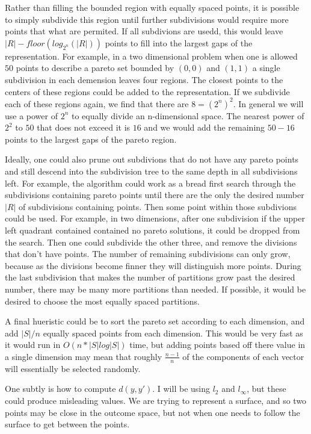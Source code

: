 \documentclass{article}
\begin{document}
{{Rather than filling the bounded region with equally spaced points, it is possible to simply subdivide this region until further subdivisions would require more points that what are permited.
If all subdivions are usedd, this would leave $|R| - floor(log_{2^n}(|R|))$ points to fill into the largest gaps of the representation.
For example, in a two dimensional problem when one is allowed $50$ points to describe a pareto set bounded by $(0,0)$ and $(1,1)$ a single subdivision in each demension leaves four regions.
The closest points to the centers of these regions could be added to the representation.
If we subdivide each of these regions again, we find that there are $8 = (2^n)^2$.
In general we will use a power of $2^n$ to equally divide an n-dimensional space.
The nearest power of $2^2$ to $50$ that does not exceed it is $16$ and we would add the remaining $50 - 16$ points to the largest gaps of the pareto region.

Ideally, one could also prune out subdivions that do not have any pareto points and still descend into the subdivision tree to the same depth in all subdivisions left.
For example, the algorithm could work as a bread first search through the subdivisions containing pareto points until there are the only the desired number $|R|$ of subdivisions containing points.
Then some point within those subdivions could be used.
For example, in two dimensions, after one subdivision if the upper left quadrant contained contained no pareto solutions, it could be dropped from the search.
Then one could subdivide the other three, and remove the divisions that don't have points.
The number of remaining subdivisions can only grow, because as the divisions become finner they will distinguish more points.
During the last subdivision that makes the number of partitions grow past the desired number, there may be many more partitions than needed.
If possible, it would be desired to choose the most equally spaced partitions.

A final hueristic could be to sort the pareto set according to each dimension, and add $|S| / n$ equally spaced points from each dimension.
This would be very fast as it would run in $O(n * |S| log |S|)$ time, but adding points based off there value in a single dimension may mean that roughly $\frac {n-1}n$ of the 
components of each vector will essentially be selected randomly.


One subtly is how to compute $d(y, y')$. I will be using $l_2$ and $l_{\infty}$, but these could produce misleading values.
We are trying to represent a surface, and so two points may be close in the outcome space, but not when one needs to follow the surface to get between the points.

}}
\end{document}
